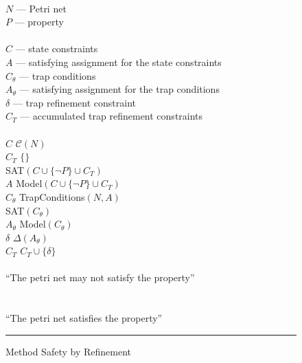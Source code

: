 \begin{figure}
\begin{minipage}[t]{.94\columnwidth}
    \algInput\\
    \tabT $N$ — Petri net \\
    \tabT $P$ — property \\
    \algVars\\
    \tabT $C$ — state constraints \\
    \tabT $A$ — satisfying assignment for the state constraints \\
    \tabT $C_\theta$ — trap conditions \\
    \tabT $A_\theta$ — satisfying assignment for the trap conditions \\
    \tabT $\delta$ — trap refinement constraint \\
    \tabT $C_T$ — accumulated trap refinement constraints \\
    \algBegin\\
    \tabT $C$ \algAssgn $\mathcal C(N)$ \\
    \tabT $C_T$ \algAssgn $\{\}$ \\
    \tabT \algWhile SAT$(C \cup \{\neg P\} \cup C_T)$ \algDo \\
    \tabTT $A$ \algAssgn Model$(C \cup \{\neg P\} \cup C_T)$ \\
    \tabTT $C_\theta$ \algAssgn TrapConditions$(N, A)$ \\
    \tabTT \algIf SAT$(C_\theta)$ \algThen \\
    \tabTTT $A_\theta$ \algAssgn Model$(C_\theta)$ \\
    \tabTTT $\delta$ \algAssgn $\Delta(A_\theta)$ \\
    \tabTTT $C_T$ \algAssgn $C_T \cup \{\delta\}$ \\
    \tabTT \algElse \\
    \tabTTT \algReturn ``The petri net may not satisfy the property'' \\
    \tabTT \algFi \\
    \tabT \algOd \\
    \tabT \algReturn ``The petri net satisfies the property'' \\
    \algEnd
  \end{minipage}
  \vspace{1.5ex}
  \hrule
\caption{Method Safety by Refinement}
\label{fig_method_safety_by_refinement}
\end{figure}
